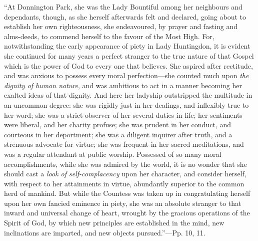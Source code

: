``At
Donnington Park, she was the Lady Bountiful among her neighbours and
dependants, though, as she herself afterwards felt and declared, going
about to establish her own righteousness, she endeavoured,
by prayer and fasting and alms-deeds, to commend herself to the favour
of the Most High. For, notwithstanding the early appearance of piety
in Lady Huntingdon, it is evident she continued for many years a
perfect stranger to the true nature of that Gospel which is the power
of God to every one that believes. She aspired after rectitude, and
was anxious to possess every moral perfection—she counted much upon \emph{the
dignity of human nature}, and was ambitious to act in a manner
becoming her exalted ideas of that dignity. And here her ladyship
outstripped the multitude in an uncommon degree: she was rigidly just
in her dealings, and inflexibly true to her word; she was a strict
observer of her several duties in life; her sentiments were liberal,
and her charity profuse; she was prudent in her conduct, and courteous
in her deportment; she was a diligent inquirer after truth, and a
strenuous advocate for virtue; she was frequent in her sacred
meditations, and was a regular attendant at public worship. Possessed
of so many moral accomplishments, while she was admired by the world,
it is no wonder that she should cast a \emph{look of self-complacency}
upon her character, and consider herself, with respect to her
attainments in virtue, abundantly superior to the common herd of
mankind. But while the Countess was taken up in congratulating herself
upon her own fancied eminence in piety, she was an absolute stranger
to that inward and universal change of heart, wrought by the gracious
operations of the Spirit of God, by which new principles are
established in the mind, new inclinations are imparted, and new
objects pursued.''—Pp. 10, 11.

